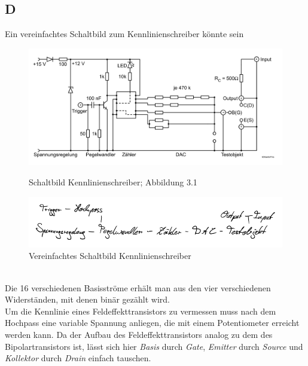 \documentclass[a4paper,10pt]{article}
\numberwithin{equation}{section}
\begin{document}
\subsection{D}
Ein vereinfachtes Schaltbild zum Kennlinienschreiber könnte sein
\begin{figure}[h]
        \begin{minipage}{0.5\textwidth}
                \centering
                \includegraphics[width=\textwidth]{kennlinienschreiber.png}
                \caption{Schaltbild Kennlinienschreiber; Abbildung 3.1 \cite{Praktikumsanleitung}}
        \end{minipage}
        \begin{minipage}{0.5\textwidth}
                \centering
                \includegraphics[width=\textwidth]{D_crop.pdf}
                \caption{Vereinfachtes Schaltbild Kennlinienschreiber}
        \end{minipage}
\end{figure}\\
Die 16 verschiedenen Basisströme erhält man aus den vier verschiedenen Widerständen, mit denen binär gezählt wird.
\\\indent Um die Kennlinie eines Feldeffekttransistors zu vermessen muss nach dem Hochpass eine variable Spannung anliegen, die mit einem Potentiometer erreicht werden kann.
Da der Aufbau des Feldeffekttransistors analog zu dem des Bipolartransistors ist, lässt sich hier \textit{Basis} durch \textit{Gate}, \textit{Emitter} durch \textit{Source} und \textit{Kollektor} durch \textit{Drain} einfach tauschen.
\end{document}
